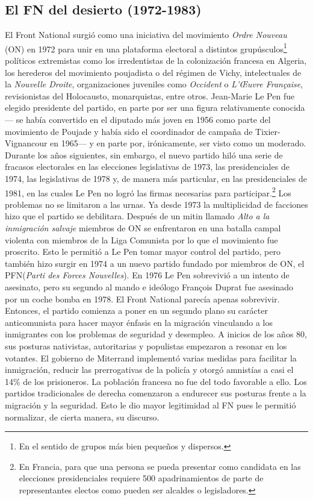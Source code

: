 \subsection{El FN del desierto (1972-1983)}

El Front National surgió como una iniciativa del movimiento \textit{Ordre Nouveau} (ON) en 1972 para unir en una plataforma electoral a distintos grupúsculos\footnote{En el sentido de grupos más bien pequeños y dispersos.} políticos extremistas como los irredentistas de la colonización francesa en Algeria, los herederos del movimiento poujadista o del régimen de Vichy, intelectuales de la \textit{Nouvelle Droite}, organizaciones juveniles como \textit{Occident} o \textit{L'\OE{}uvre Française}, revisionistas del Holocausto, monarquistas, entre otros. Jean-Marie Le Pen fue elegido presidente del partido, en parte por ser una figura relativamente conocida--- se había convertido en el diputado más joven en 1956 como parte del movimiento de Poujade y había sido el coordinador de campaña de Tixier-Vignancour en 1965--- y en parte por, irónicamente, ser visto como un moderado.\\ 

Durante los años siguientes, sin embargo, el nuevo partido hiló una serie de fracasos electorales en las elecciones legislativas de 1973, las presidenciales de 1974, las legislativas de 1978 y, de manera más particular, en las presidenciales de 1981, en las cuales Le Pen no logró las firmas necesarias para participar.\footnote{En Francia, para que una persona se pueda presentar como candidata en las elecciones presidenciales requiere 500 apadrinamientos de parte de representantes electos como pueden ser alcaldes o legisladores.} Los problemas no se limitaron a las urnas. Ya desde 1973 la multiplicidad de facciones hizo que el partido se debilitara. Después de un mitin llamado \textit{Alto a la inmigración salvaje} miembros de ON se enfrentaron en una batalla campal violenta con miembros de la Liga Comunista por lo que el movimiento fue proscrito. Esto le permitió a Le Pen tomar mayor control del partido, pero también hizo surgir en 1974 a un nuevo partido fundado por miembros de ON, el PFN(\textit{Parti des Forces Nouvelles}). En 1976 Le Pen sobrevivió a un intento de asesinato, pero su segundo al mando e ideólogo François Duprat fue asesinado por un coche bomba en 1978. El Front National parecía apenas sobrevivir.\\

Entonces, el partido comienza a poner en un segundo plano su carácter anticomunista para hacer mayor énfasis en la migración vinculando a los inmigrantes con los problemas de seguridad y desempleo. A inicios de los años 80, sus posturas nativistas, autoritarias y populistas empezaron a resonar en los votantes. El gobierno de Miterrand implementó varias medidas para facilitar la inmigración, reducir las prerrogativas de la policía y otorgó amnistías a casi el 14\% de los prisioneros. La población francesa no fue del todo favorable a ello. Los partidos tradicionales de derecha comenzaron a endurecer sus posturas frente a la migración y la seguridad. Esto le dio mayor legitimidad al FN pues le permitió normalizar, de cierta manera, su discurso.\\ 

